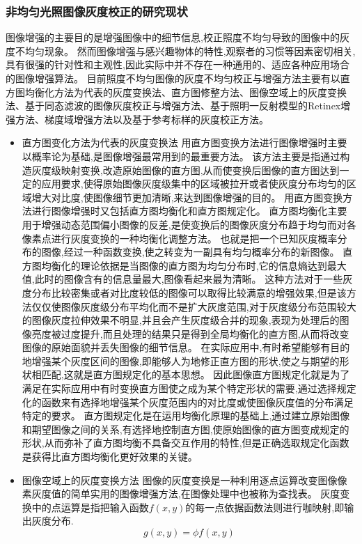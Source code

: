 \documentclass{amsart}
\begin{document}
\subsubsection{非均匀光照图像灰度校正的研究现状}
\label{sec:0205}
图像增强的主要目的是增强图像中的细节信息,校正照度不均匀导致的图像中的灰度不均匀现象。
然而图像增强与感兴趣物体的特性,观察者的习惯等因素密切相关,具有很强的针对性和主观性,因此实际中并不存在一种通用的、适应各种应用场合的图像增强算法。
目前照度不均匀图像的灰度不均匀校正与增强方法主要有以直方图均衡化方法为代表的灰度变换法、直方图修整方法、图像空域上的灰度变换法、基于同态滤波的图像灰度校正与增强方法、基于照明一反射模型的Retinex增强方法、梯度域增强方法以及基于参考标样的灰度校正方法。
\begin{itemize}
\item 直方图变化方法为代表的灰度变换法
  用直方图变换方法进行图像增强时主要以概率论为基础,是图像增强最常用到的最重要方法。
  该方法主要是指通过构造灰度级映射变换,改造原始图像的直方图,从而使变换后图像的直方图达到一定的应用要求,使得原始图像灰度级集中的区域被拉开或者使灰度分布均匀的区域增大对比度,使图像细节更加清晰,来达到图像增强的目的。
  用直方图变换方法进行图像增强时又包括直方图均衡化和直方图规定化。
  直方图均衡化主要用于增强动态范围偏小图像的反差,是使变换后的图像灰度分布趋于均匀而对各像素点进行灰度变换的一种均衡化调整方法。
  也就是把一个已知灰度概率分布的图像,经过一种函数变换,使之转变为一副具有均匀概率分布的新图像。
  直方图均衡化的理论依据是当图像的直方图为均匀分布时,它的信息熵达到最大值,此时的图像含有的信息量最大,图像看起来最为清晰。
  这种方法对于一些灰度分布比较密集或者对比度较低的图像可以取得比较满意的增强效果,但是该方法仅仅使图像灰度级分布平均化而不是扩大灰度范围,对于灰度级分布范围较大的图像灰度拉伸效果不明显,并且会产生灰度级合并的现象,表现为处理后的图像亮度被过度提升,而且处理的结果只是得到全局均衡化的直方图,从而将改变图像的原始面貌并丢失图像的细节信息。
  在实际应用中,有时希望能够有目的地增强某个灰度区间的图像,即能够人为地修正直方图的形状,使之与期望的形状相匹配,这就是直方图规定化的基本思想。
  因此图像直方图规定化就是为了满足在实际应用中有时变换直方图使之成为某个特定形状的需要,通过选择规定化的函数来有选择地增强某个灰度范围内的对比度或使图像灰度值的分布满足特定的要求。
  直方图规定化是在运用均衡化原理的基础上,通过建立原始图像和期望图像之间的关系,有选择地控制直方图,使原始图像的直方图变成规定的形状,从而弥补了直方图均衡不具备交互作用的特性,但是正确选取规定化函数是获得比直方图均衡化更好效果的关键。
\item 图像空域上的灰度变换方法
  图像的灰度变换是一种利用逐点运算改变图像像素灰度值的简单实用的图像增强方法,在图像处理中也被称为查找表。
  灰度变换中的点运算是指把输入函数$f(x,y)$的每一点依据函数法则进行咖映射,即输出灰度分布.
  \begin{equation}
    \label{eq:20}
g(x,y)=\phi f(x,y)
\end{equation}


\end{itemize}
\end{document}
